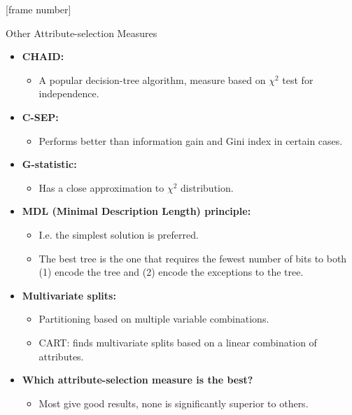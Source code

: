 \documentclass[aspectratio=169,t,table]{beamer}
\begin{document}
  {
    [frame number]
    \begin{frame}{Other Attribute-selection Measures}
      \begin{itemize}
        \item \textbf{CHAID:}
        \begin{itemize}
          \item A popular decision-tree algorithm, measure based on $\chi^2$ test for independence.
        \end{itemize}
        \item \textbf{C-SEP:}
        \begin{itemize}
          \item Performs better than information gain and Gini index in certain cases.
        \end{itemize}
        \item \textbf{G-statistic:}
        \begin{itemize}
          \item Has a close approximation to $\chi^2$ distribution.
        \end{itemize}
        \item \textbf{MDL (Minimal Description Length) principle:}
        \begin{itemize}
          \item I.e. the simplest solution is preferred.
          \item The best tree is the one that requires the fewest number of bits to both (1) encode the tree and (2) encode the exceptions to the tree.
        \end{itemize}
        \item \textbf{Multivariate splits:}
        \begin{itemize}
          \item Partitioning based on multiple variable combinations.
          \item CART: finds multivariate splits based on a linear combination of attributes.
        \end{itemize}
        \item \textbf{Which attribute-selection measure is the best?}
        \begin{itemize}
          \item Most give good results, none is significantly superior to others.
        \end{itemize}
      \end{itemize}
    \end{frame}
  }
\end{document}
